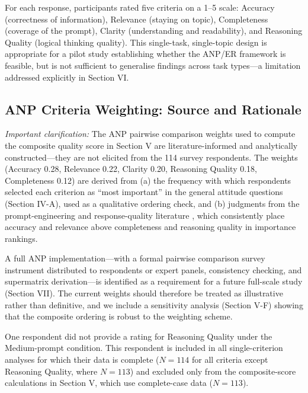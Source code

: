 \documentclass[conference]{IEEEtran}
\begin{document}
For each response, participants rated five criteria on a 1--5 scale: Accuracy (correctness of information), Relevance (staying on topic), Completeness (coverage of the prompt), Clarity (understanding and readability), and Reasoning Quality (logical thinking quality). This single-task, single-topic design is appropriate for a pilot study establishing whether the ANP/ER framework is feasible, but is not sufficient to generalise findings across task types---a limitation addressed explicitly in Section VI.

\subsection{ANP Criteria Weighting: Source and Rationale}
\textit{Important clarification:} The ANP pairwise comparison weights used to compute the composite quality score in Section V are literature-informed and analytically constructed---they are not elicited from the 114 survey respondents. The weights (Accuracy 0.28, Relevance 0.22, Clarity 0.20, Reasoning Quality 0.18, Completeness 0.12) are derived from (a) the frequency with which respondents selected each criterion as ``most important'' in the general attitude questions (Section IV-A), used as a qualitative ordering check, and (b) judgments from the prompt-engineering and response-quality literature \cite{liu2025,balaji2024}, which consistently place accuracy and relevance above completeness and reasoning quality in importance rankings.

A full ANP implementation---with a formal pairwise comparison survey instrument distributed to respondents or expert panels, consistency checking, and supermatrix derivation---is identified as a requirement for a future full-scale study (Section VII). The current weights should therefore be treated as illustrative rather than definitive, and we include a sensitivity analysis (Section V-F) showing that the composite ordering is robust to the weighting scheme.

One respondent did not provide a rating for Reasoning Quality under the Medium-prompt condition. This respondent is included in all single-criterion analyses for which their data is complete ($N=114$ for all criteria except Reasoning Quality, where $N=113$) and excluded only from the composite-score calculations in Section V, which use complete-case data ($N=113$).
\end{document}
